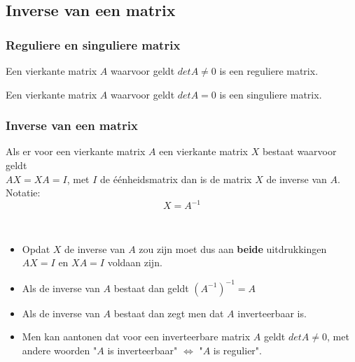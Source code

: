 \subsection{Inverse van een matrix}

\subsubsection{Reguliere en singuliere matrix}

Een vierkante matrix $A$ waarvoor geldt $det A \neq 0$ is een reguliere matrix.

Een vierkante matrix $A$ waarvoor geldt $det A =0$ is een singuliere matrix.

\subsubsection{Inverse van een matrix}

Als er voor een vierkante matrix $A$ een vierkante matrix $X$ bestaat waarvoor geldt\\ $AX=XA=I$, met $I$ de \'{e}\'{e}nheidsmatrix dan is de matrix $X$ de inverse van $A$.\\
Notatie:
\[ X=A^{-1} \]

\begin{opmerking}
	\ \\
\begin{itemize}
	\item Opdat $X$ de inverse van $A$ zou zijn moet dus aan {\bf beide} uitdrukkingen $AX=I$ en $XA=I$ voldaan zijn.
	\item Als de inverse van $A$ bestaat dan geldt $(A^{-1})^{-1}=A$
	\item Als de inverse van $A$ bestaat dan zegt men dat $A$ inverteerbaar is.
	\item Men kan aantonen dat voor een inverteerbare matrix $A$ geldt $det A \neq 0$, met andere woorden "$A$ is inverteerbaar" $\Leftrightarrow$ "$A$ is regulier". 
\end{itemize}
\end{opmerking}


